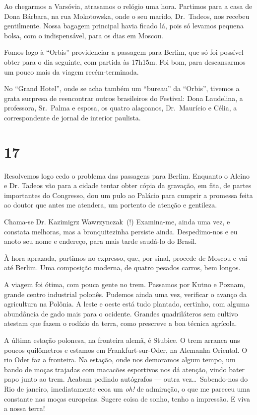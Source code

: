 Ao chegarmos a Varsóvia, atrasamos o relógio uma hora. Partimos para a casa de Dona Bárbara, na rua Mokotowska, onde o seu marido, Dr.~Tadeos, nos recebeu gentilmente. Nossa bagagem principal havia ficado lá, pois só levamos pequena bolsa, com o indispensável, para os dias em Moscou.

Fomos logo à ``Orbis'' providenciar a passagem para Berlim, que só foi possível obter para o dia seguinte, com partida às 17h15m. Foi bom, para descansarmos um pouco mais da viagem recém-terminada.

No ``Grand Hotel'', onde se acha também um ``bureau'' da ``Orbis'', tivemos a grata surpresa de reencontrar outros brasileiros do Festival: Dona Laudelina, a professora, Sr.~Palma e esposa, os quatro alagoanos, Dr.~Maurício e Célia, a correspondente de jornal de interior paulista.

\section*{17 \adfflatleafright {}}
Resolvemos logo cedo o problema das passagens para Berlim. Enquanto o Alcino e Dr. Tadeos vão para a cidade tentar obter cópia da gravação, em fita, de partes importantes do Congresso, dou um pulo ao Palácio para cumprir a promessa feita ao doutor que antes me atendera, um portento de atenção e gentileza.

Chama-se Dr. Kazimigrz Wawrzynczak~(!) Examina-me, ainda uma vez, e constata melhoras, mas a bronquitezinha persiste ainda. Des\-pe\-di\-mo-nos e eu anoto seu nome e endereço, para mais tarde saudá-lo do Brasil.

À hora aprazada, partimos no expresso, que, por sinal, procede de Moscou e vai até Berlim. Uma composição moderna, de quatro pesados carros, bem longos.

A viagem foi ótima, com pouca gente no trem. Passamos por Kutno e Poznam, grande centro industrial polonês. Pudemos ainda uma vez, verificar o avanço da agricultura na Polônia. A leste e oeste está tudo plantado, certinho, com alguma abundância de gado mais para o ocidente. Grandes quadriláteros sem cultivo atestam que fazem o rodízio da terra, como prescreve a boa técnica agrícola.

A última estação polonesa, na fronteira alemã, é Stubice. O trem arranca uns poucos quilômetros e estamos em Frankfurt-sur-Oder, na Alemanha Oriental. O rio Oder faz a fronteira. Na estação, onde nos demoramos algum tempo, um bando de moças trajadas com macacões esportivos nos dá atenção, vindo bater papo junto ao trem. Acabam pedindo autógrafos --- outra vez\ldots\ Sabendo-nos do Rio de janeiro, imediatamente ecoa um \textit{oh!} de admiração, o que me pareceu uma constante nas moças europeias. Sugere coisa de sonho, tenho a impressão. E viva a nossa terra!

